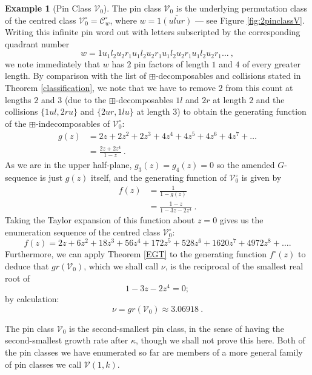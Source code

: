 \documentclass[11pt,a4paper]{article}
\theoremstyle{definition}
\newtheorem{example}[thm]{Example}
\begin{document}
\begin{example}[Pin Class $\mathcal{V}_{0}$] \label{ex:defV}
The pin class $\mathcal{V}_{0}$ is the underlying permutation class of the centred class $\mathcal{V}^{\circ}_{0} = \mathcal{C}^{\circ}_{w}$, where $w = 1\overline{(ulur)}$ --- see Figure \ref{fig:2pinclassV}. Writing this infinite pin word out with letters subscripted by the corresponding quadrant number
\[
w = 1u_{1}l_{2}u_{2}r_{1}u_{1}l_{2}u_{2}r_{1}u_{1}l_{2}u_{2}r_{1}u_{1}l_{2}u_{2}r_{1} \dots \ ,
\]
we note immediately that $w$ has $2$ pin factors of length $1$ and $4$ of every greater length. By comparison with the list of $\boxplus$-decomposables and collisions stated in Theorem \ref{classification}, we note that we have to remove $2$ from this count at lengths $2$ and $3$ (due to the $\boxplus$-decomposables $1l$ and $2r$ at length $2$ and the collisions $\{1ul,2ru\}$ and $\{2ur,1lu\}$ at length $3$) to obtain the generating function of the $\boxplus$-indecomposables of $\mathcal{V}^{\circ}_{0}$:
\[
\begin{split}
g(z) & = 2z + 2z^2 + 2z^3 + 4z^4 + 4z^5 + 4z^6 + 4z^7 + \dots \\
 & = \frac{2z + 2z^4}{1-z} \ .
\end{split}
\]
As we are in the upper half-plane, $g_{3}(z)=g_{4}(z)=0$ so the amended $G$-sequence is just $g(z)$ itself, and the generating function of $\mathcal{V}^{\circ}_{0}$ is given by
\[
\begin{split}
f(z) & = \frac{1}{1 - g(z)} \\
 & = \frac{1-z}{1 - 3z - 2z^4} \ .
\end{split}
\]
Taking the Taylor expansion of this function about $z=0$ gives us the enumeration sequence of the centred class $\mathcal{V}^{\circ}_{0}$:
\[
f(z) = 2z + 6z^2 + 18z^3 + 56z^4 + 172z^5 + 528z^6 + 1620z^7 + 4972z^8 +\dots .
\]
Furthermore, we can apply Theorem \ref{EGT} to the generating function $f^{\circ}(z)$ to deduce that $gr(\mathcal{V}_{0})$, which we shall call $\nu$, is the reciprocal of the smallest real root of 
\[
1 - 3z - 2z^4 = 0;
\]
by calculation:
\[
\nu = gr(\mathcal{V}_{0}) \approx 3.06918 \ .
\]
\end{example}

The pin class $\mathcal{V}_{0}$ is the second-smallest pin class, in the sense of having the second-smallest growth rate after $\kappa$, though we shall not prove this here. Both of the pin classes we have enumerated so far are members of a more general family of pin classes we call $\mathcal{V}(1,k)$.
\end{document}
